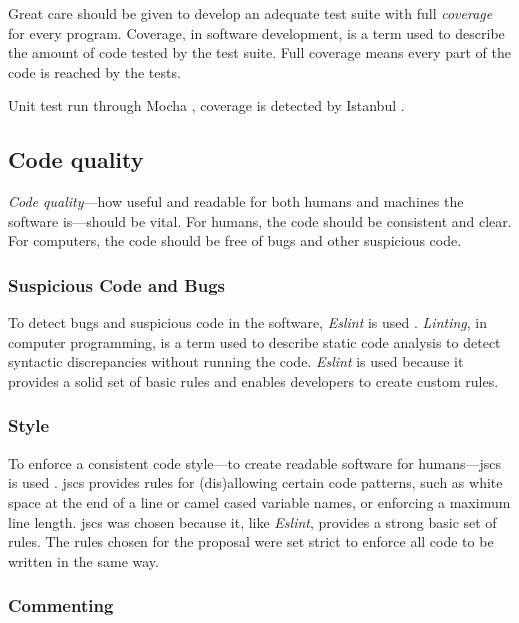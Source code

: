 \noindent Great care should be given to develop an adequate test suite with
  full \emph{coverage} for every program.
Coverage, in software development, is a term used to describe the amount of
  code tested by the test suite.
Full coverage means every part of the code is reached by the tests.

Unit test run through Mocha \autocite{visionmedia/mocha-source-code},
  coverage is detected by Istanbul
  \autocite{gotwarlost/istanbul-source-code}.

\subsection{Code quality}\label{code-quality}

\emph{Code quality}---how useful and readable for both humans and machines
  the software is---should be vital. For humans, the code should be
  consistent and clear. For computers, the code should be free of bugs and
  other suspicious code.

\subsubsection{Suspicious Code and Bugs}\label{suspicious-code-and-bugs}

To detect bugs and suspicious code in the software, \emph{Eslint}
  is used \autocite{eslint/eslint-source-code}.
\emph{Linting}, in computer programming, is a term used to describe static
  code analysis to detect syntactic discrepancies without running the code.
\emph{Eslint} is used because it provides a solid set of basic rules and
  enables developers to create custom rules.

\subsubsection{Style}\label{style}

To enforce a consistent code style---to create readable software for
  humans---\acrshort{jscs} is used \autocite{mdevils/node-jscs-source-code}.
\acrshort{jscs} provides rules for (dis)allowing certain code patterns,
  such as white space at the end of a line or camel cased variable names,
  or enforcing a maximum line length.
\acrshort{jscs} was chosen because it, like \emph{Eslint}, provides a strong
  basic set of rules.
The rules chosen for the proposal were set strict to enforce all code to be
  written in the same way.

\subsubsection{Commenting}\label{commenting}

